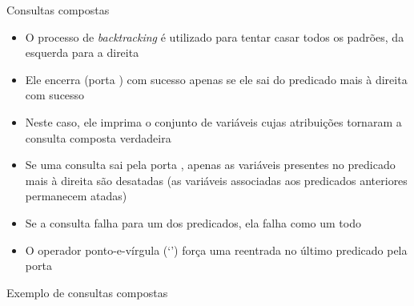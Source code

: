 \begin{frame}[fragile]{Consultas compostas}

    \begin{itemize}
        \item O processo de \textit{backtracking} é utilizado para tentar casar todos os 
            padrões, da esquerda para a direita

        \item Ele encerra (porta ) com sucesso apenas se ele sai do 
            predicado mais à direita com sucesso

        \item Neste caso, ele imprima o conjunto de variáveis cujas atribuições tornaram
            a consulta composta verdadeira

        \item Se uma consulta sai pela porta , apenas as variáveis presentes 
            no predicado mais à direita são desatadas (as variáveis associadas aos predicados 
            anteriores permanecem atadas)

        \item Se a consulta falha para um dos predicados, ela falha como um todo

        \item O operador ponto-e-vírgula (`') força uma reentrada no
            último predicado pela porta 

    \end{itemize}

\end{frame}



\begin{frame}[fragile]{Exemplo de consultas compostas}


\end{frame}

